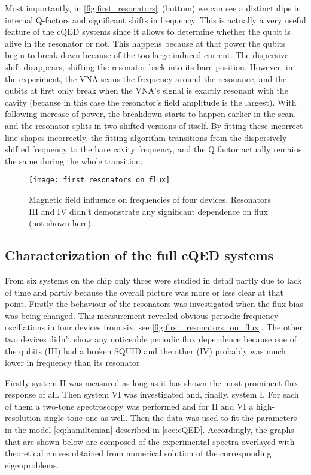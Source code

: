 \documentclass[12pt, twoside]{report}
\numberwithin{equation}{section}
\begin{document}
Most importantly, in \autoref{fig:first_resonators}~(bottom) we can see a distinct dips in internal Q-factors and significant shifts in frequency. This is actually a very useful feature of the cQED systems since it allows to determine whether the qubit is alive in the resonator or not. This happens because at that power the qubits begin to break down because of the too large induced current. The dispersive shift disappears, shifting the resonator back into its bare position. However, in the experiment, the VNA scans the frequency around the resonance, and the qubits at first only break when the VNA's signal is exactly resonant with the cavity (because in this case the resonator's field amplitude is the largest). With following increase of power, the breakdown starts to happen earlier in the scan, and the resonator splits in two shifted versions of itself. By fitting these incorrect line shapes incorrectly, the fitting algorithm transitions from the dispersively shifted frequency to the bare cavity frequency, and the Q factor actually remains the same during the whole transition. 

\begin{figure}
\centering
\texttt{[image: first\_resonators\_on\_flux]}
\caption{Magnetic field influence on frequencies of four devices. Resonators III and IV didn't demonstrate any significant dependence on flux (not shown here).}
\label{fig:first_resonators_on_flux}
\end{figure} 

\subsection{Characterization of the full cQED systems}

From six systems on the chip only three were studied in detail partly due to lack of time and partly because the overall picture was more or less clear at that point. Firstly the behaviour of the resonators was investigated when the flux bias was being changed. This measurement revealed obvious periodic frequency oscillations in four devices from six, see \autoref{fig:first_resonators_on_flux}. The other two devices didn't show any noticeable periodic flux dependence because one of the qubits (III) had a broken SQUID and the other (IV) probably was much lower in frequency than its resonator.

Firstly system II was measured as long as it has shown the most prominent flux response of all. Then system VI was investigated and, finally, system I. For each of them a two-tone spectroscopy was performed and for II and VI a high-resolution single-tone one as well. Then the data was used to fit the parameters in the model \eqref{eq:hamiltonian} described in \autoref{sec:cQED}. Accordingly, the graphs that are shown below are composed of the experimental spectra overlayed with theoretical curves obtained from numerical solution of the corresponding eigenproblems.
\end{document}
